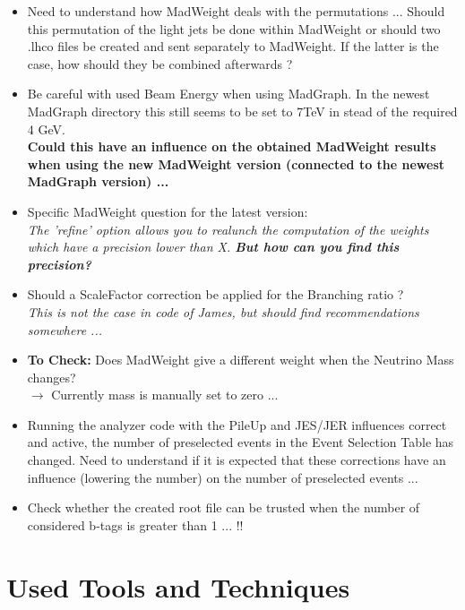\documentclass[a4paper,12pt]{report}
\begin{document}
\begin{itemize}
  \item Need to understand how MadWeight deals with the permutations ... Should this permutation of the light jets be done within MadWeight or should two .lhco files be created and sent separately to MadWeight. If the latter is the case, how should they be combined afterwards ?
  \item Be careful with used Beam Energy when using MadGraph. In the newest MadGraph directory this still seems to be set to 7TeV in stead of the required 4 GeV. \\ \textbf{Could this have an influence on the obtained MadWeight results when using the new MadWeight version (connected to the newest MadGraph version) ...}
  \item Specific MadWeight question for the latest version: \\ \textit{The 'refine' option allows you to realunch the computation of the weights which have a precision lower than X. \textbf{But how can you find this precision?}}
  \item Should a ScaleFactor correction be applied for the Branching ratio ? \\ \textit{This is not the case in code of James, but should find recommendations somewhere ...}
  \item \textbf{To Check:} Does MadWeight give a different weight when the Neutrino Mass changes?\\ $\rightarrow$ Currently mass is manually set to zero ...
  \item Running the analyzer code with the PileUp and JES/JER influences correct and active, the number of preselected events in the Event Selection Table has changed. Need to understand if it is expected that these corrections have an influence (lowering the number) on the number of preselected events ...
  \item Check whether the created root file can be trusted when the number of considered b-tags is greater than 1 ... !!
\end{itemize}

\newpage
\chapter{Used Tools and Techniques}

\end{document}

